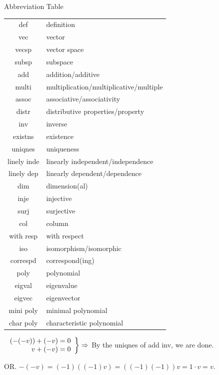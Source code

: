 \documentclass[a4paper, 11pt, UTF8]{article}
\def\Or{{\large O{\footnotesize R.} }}
\begin{document}
\begin{large}
{\begin{center}
\vspace{20pt}
Abbreviation Table\vspace{8pt}\par
\begin{tabularx}{0.55\textwidth} { 
		| c |
		| >{\raggedright\arraybackslash}X| }
	\hline
def&			definition\\
vec&			vector\\
vecsp&			vector space\\
subsp&			subspace\\
add&			addition/additive\\
multi&			multiplication/multiplicative/multiple\\
assoc&			associative/associativity\\
distr&			distributive properties/property\\
inv&			inverse\\
existns&		existence\\
uniqnes&		uniqueness\\
linely inde&	linearly independent/independence\\
linely dep&		linearly dependent/dependence\\
dim&			dimension(al)\\
inje&			injective\\
surj&			surjective\\
col&			column\\
with resp&		with respect\\
iso&			isomorphism/isomorphic\\
correspd&		correspond(ing)\\
poly&			polynomial\\
eigval&			eigenvalue\\
eigvec&			eigenvector\\
mini poly&		minimal polynomial\\
char poly&		characteristic polynomial\\\hline
\end{tabularx}
\end{center}

\clearpage
}{}


\vspace{2pt}\par\quad
$\MathRightBrace{r}{\,(-(-v))+(-v)=0\\$ $v+(-v)=0}\Rightarrow$ By the uniqnes of add inv, we are done.\vspace{6pt}\par\quad
\Or $-(-v)=(-1)((-1)v)=((-1)(-1))v=1\cdot v=v.$\PfEnd
\SepLine


\end{large}
\end{document}
